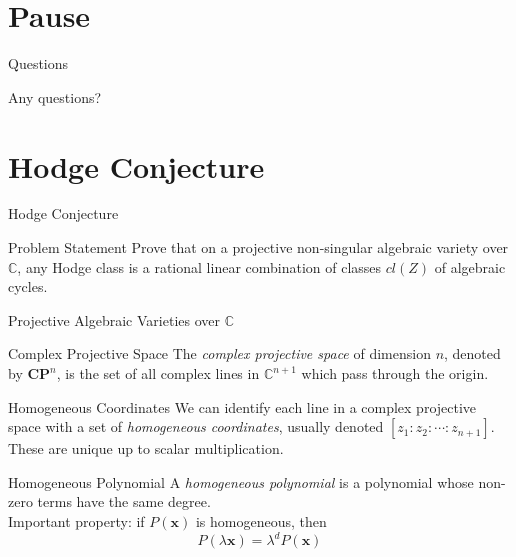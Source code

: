 \documentclass{beamer}
\newcommand{\Complex}{\mathbb{C}}
\newcommand{\CP}{\mathbf{CP}}
\renewcommand{\vec}[1]{\mathbf{#1}}
\begin{document}
  \section{Pause}
  \begin{frame}{Questions}
      \begin{block}{}
          Any questions?
      \end{block}
  \end{frame}


  \section{Hodge Conjecture}
  \begin{frame}{Hodge Conjecture}
      \begin{block}{Problem Statement}
          Prove that on a projective non-singular algebraic variety over
          $\Complex$, any Hodge class is a rational linear combination of
          classes $cl(Z)$ of algebraic cycles.
      \end{block}
  \end{frame}
  \begin{frame}{Projective Algebraic Varieties over $\Complex$}
      \pause
      \begin{block}{Complex Projective Space}
          The \textit{complex projective space} of dimension $n$, denoted by
          $\CP^n$, is the set of all \alert{complex} lines in $\Complex^{n+1}$
          which pass through the origin.
      \end{block}
      \pause
      \begin{block}{Homogeneous Coordinates}
          We can identify each line in a complex projective space with a set of
          \textit{homogeneous coordinates}, usually denoted $[z_1 : z_2 :
          \cdots : z_{n+1}]$. These are unique up to scalar multiplication.
      \end{block}
      \pause
      \begin{block}{Homogeneous Polynomial}
          A \textit{homogeneous polynomial} is a polynomial whose non-zero
          terms have the same degree.
          \pause\\
          Important property: if $P(\vec{x})$ is homogeneous, then
          $$P(\lambda\vec{x}) = \lambda^d P(\vec{x})$$
      \end{block}
  \end{frame}
\end{document}
